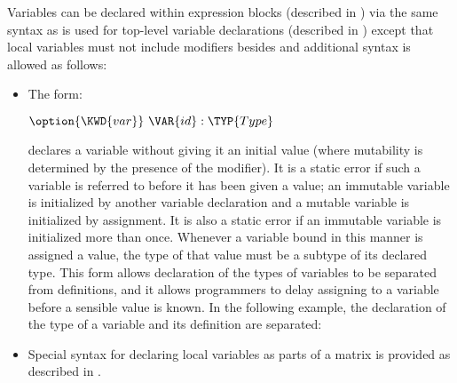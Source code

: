 Variables can be declared within expression blocks (described in
) via the same syntax as is used for top-level
variable declarations (described in ) except that
local variables must not include modifiers besides  and
additional syntax is allowed as follows:
\begin{itemize}
\item
The form:
\begin{Fortress}
\(\option{\KWD{var}}\ \VAR{id} \mathrel{\mathtt{:}} \TYP{Type}\)
\end{Fortress}
declares a variable without giving it an initial value
(where mutability is determined by the presence of the  modifier).
It is a static error if such a variable is referred to before it has been
given a value; an immutable variable is initialized by another variable
declaration and a mutable variable is initialized by assignment.
It is also a static error if an immutable variable is initialized more than once.
Whenever a variable bound in this manner is assigned a value, the type of
that value must be a subtype of its declared type.
This form allows declaration of the types of variables to be separated
from definitions, and it allows programmers to delay assigning to a variable
before a sensible value is known.
In the following example, the declaration of the type of a variable and its
definition are separated:


\item Special syntax for declaring local variables as parts of a
matrix is provided as described in .
\end{itemize}


